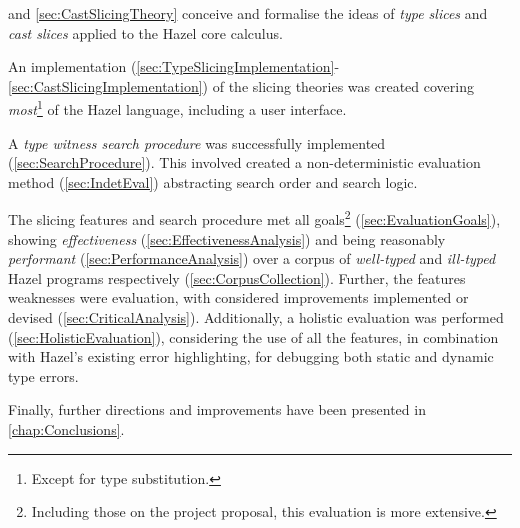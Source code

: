  and \cref{sec:CastSlicingTheory} conceive and formalise the ideas of \textit{type slices} and \textit{cast slices} applied to the Hazel core calculus. 
 
 An implementation (\cref{sec:TypeSlicingImplementation}-\ref{sec:CastSlicingImplementation}) of the slicing theories was created covering \textit{most}\footnote{Except for type substitution.} of the Hazel language, including a user interface. 
 
 A \textit{type witness search procedure} was successfully implemented (\cref{sec:SearchProcedure}). This involved created a non-deterministic evaluation method (\cref{sec:IndetEval}) abstracting search order and search logic.

The slicing features and search procedure met all goals\footnote{Including those on the project proposal, this evaluation is more extensive.} (\cref{sec:EvaluationGoals}), showing \textit{effectiveness} (\cref{sec:EffectivenessAnalysis}) and being reasonably \textit{performant} (\cref{sec:PerformanceAnalysis}) over a corpus of \textit{well-typed} and \textit{ill-typed} Hazel programs respectively (\cref{sec:CorpusCollection}). Further, the features weaknesses were evaluation, with considered improvements implemented or devised (\cref{sec:CriticalAnalysis}). Additionally, a holistic evaluation was performed (\cref{sec:HolisticEvaluation}), considering the use of all the features, in combination with Hazel's existing error highlighting, for debugging both static and dynamic type errors.

Finally, further directions and improvements have been presented in \cref{chap:Conclusions}.